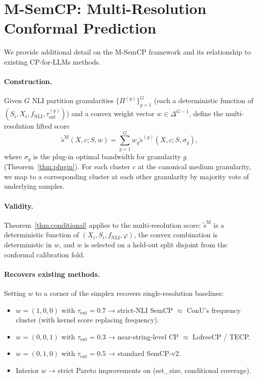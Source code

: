 \section{M-SemCP: Multi-Resolution Conformal Prediction}
\label{app:msemcp}

We provide additional detail on the M-SemCP framework and its
relationship to existing CP-for-LLMs methods.

\paragraph{Construction.} Given $G$ NLI partition granularities
$\{\Pi^{(g)}\}_{g=1}^{G}$ (each a deterministic function of
$(S_i, X_i, f_\text{NLI}, \tau_\text{ent}^{(g)})$) and a convex weight
vector $w \in \Delta^{G-1}$, define the multi-resolution lifted score
\[
\tilde{s}^\text{M}(X, c; S, w) =
   \sum_{g=1}^{G} w_g \tilde{s}^{(g)}(X, c; S, \sigma_g),
\]
where $\sigma_g$ is the plug-in optimal bandwidth for granularity $g$
(Theorem~\ref{thm:plugin}). For each cluster $c$ at the canonical
medium granularity, we map to a corresponding cluster at each other
granularity by majority vote of underlying samples.

\paragraph{Validity.} Theorem~\ref{thm:conditional} applies to the
multi-resolution score: $\tilde{s}^\text{M}$ is a deterministic function
of $(X_i, S_i, f_\text{NLI}, \varphi)$, the convex combination is
deterministic in $w$, and $w$ is selected on a held-out split disjoint
from the conformal calibration fold.

\paragraph{Recovers existing methods.} Setting $w$ to a corner of the
simplex recovers single-resolution baselines:
\begin{itemize}
\item $w = (1, 0, 0)$ with $\tau_\text{ent} = 0.7$ → strict-NLI SemCP $\approx$ ConU's frequency cluster (with kernel score replacing frequency).
\item $w = (0, 0, 1)$ with $\tau_\text{ent} = 0.3$ → near-string-level CP $\approx$ LofreeCP / TECP.
\item $w = (0, 1, 0)$ with $\tau_\text{ent} = 0.5$ → standard SemCP-v2.
\item Interior $w$ → strict Pareto improvements on (set\_size, conditional coverage).
\end{itemize}

